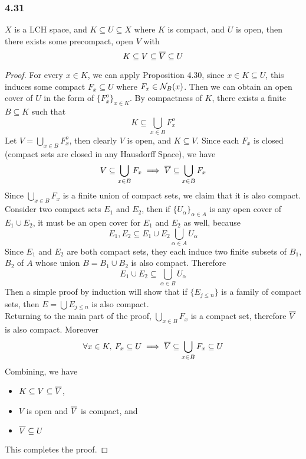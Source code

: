 \documentclass[../../main.tex]{subfiles}
\begin{document}
\subsubsection*{4.31}
\begin{wts}
    $X$ is a LCH space, and $K\subseteq U\subseteq X$ where $K$ is compact, and $U$ is open, then there exists some precompact, open $V$ with
    \[
    K\subseteq V\subseteq \overline{V}\subseteq U
    \]
\end{wts}
\begin{proof}
    For every $x\in K$, we can apply Proposition 4.30, since $x\in K\subseteq U$, this induces some compact $F_x\subseteq U$ where $F_x\in\mathcal{N}_B({x})$. Then we can obtain an open cover of $U$ in the form of $\{F_x^o\}_{x\in K}$. By compactness of $K$, there exists a finite $B\subseteq K$ such that 
    \[
    K\subseteq \bigcup_{x\in B} F_x^o
    \]
    Let $V = \bigcup_{x\in B}F_x^o$, then clearly $V$ is open, and $K\subseteq V$. Since each $F_x$ is closed (compact sets are closed in any Hausdorff Space), we have
    \[
    V\subseteq \bigcup_{x\in B}F_x\implies\overline{V}\subseteq\bigcup_{x\in B}F_x
    \]
    Since $\bigcup_{x\in B}F_x$ is a finite union of compact sets, we claim that it is also compact. Consider two compact sets $E_1$ and $E_2$, then if $\{U_\alpha\}_{\alpha\in A}$ is any open cover of $E_1\cup E_2$, it must be an open cover for $E_1$ and $E_2$ as well, because
    \[
    E_1,E_2\subseteq E_1\cup E_2 \bigcup_{\alpha\in A} U_\alpha
    \]
    Since $E_1$ and $E_2$ are both compact sets, they each induce two finite subsets of $B_1$, $B_2$ of $A$ whose union $B = B_1\cup B_2$ is also compact. Therefore
    \[
    E_1\cup E_2 \subseteq \bigcup_{\alpha\in B}U_\alpha
    \]
    Then a simple proof by induction will show that if $\{E_{j\leq n}\}$ is a family of compact sets, then $E = \bigcup E_{j\leq n}$ is also compact.\\
    
    Returning to the main part of the proof, $\bigcup_{x\in B}F_x$ is a compact set, therefore $\overline{V}$ is also compact. Moreover
    \[
    \forall x\in K,\: F_x\subseteq U\implies \overline{V}\subseteq\bigcup_{x\in B}F_x\subseteq U
    \]
    Combining, we have
    \begin{itemize}
        \item $K\subseteq V\subseteq \overline{V}$, 
        \item $V$ is open and $\overline{V}$ is compact, and
        \item $\overline{V}\subseteq U$
    \end{itemize}
    This completes the proof.
\end{proof}
\end{document}

